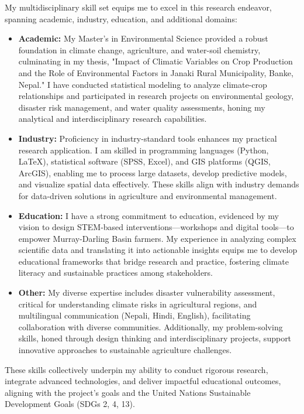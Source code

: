 My multidisciplinary skill set equips me to excel in this research endeavor, spanning academic, industry, education, and additional domains:

\begin{itemize}
    \item \textbf{Academic:} My Master’s in Environmental Science provided a robust foundation in climate change, agriculture, and water-soil chemistry, culminating in my thesis, "Impact of Climatic Variables on Crop Production and the Role of Environmental Factors in Janaki Rural Municipality, Banke, Nepal." I have conducted statistical modeling to analyze climate-crop relationships and participated in research projects on environmental geology, disaster risk management, and water quality assessments, honing my analytical and interdisciplinary research capabilities.
    
    \item \textbf{Industry:} Proficiency in industry-standard tools enhances my practical research application. I am skilled in programming languages (Python, LaTeX), statistical software (SPSS, Excel), and GIS platforms (QGIS, ArcGIS), enabling me to process large datasets, develop predictive models, and visualize spatial data effectively. These skills align with industry demands for data-driven solutions in agriculture and environmental management.
    
    \item \textbf{Education:} I have a strong commitment to education, evidenced by my vision to design STEM-based interventions—workshops and digital tools—to empower Murray-Darling Basin farmers. My experience in analyzing complex scientific data and translating it into actionable insights equips me to develop educational frameworks that bridge research and practice, fostering climate literacy and sustainable practices among stakeholders.
    
    \item \textbf{Other:} My diverse expertise includes disaster vulnerability assessment, critical for understanding climate risks in agricultural regions, and multilingual communication (Nepali, Hindi, English), facilitating collaboration with diverse communities. Additionally, my problem-solving skills, honed through design thinking and interdisciplinary projects, support innovative approaches to sustainable agriculture challenges.
\end{itemize}

These skills collectively underpin my ability to conduct rigorous research, integrate advanced technologies, and deliver impactful educational outcomes, aligning with the project’s goals and the United Nations Sustainable Development Goals (SDGs 2, 4, 13).